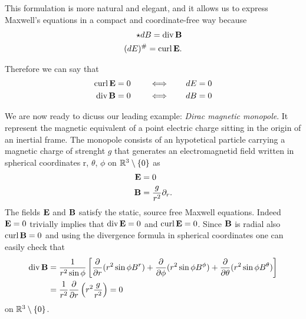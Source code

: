\documentclass{article}
\theoremstyle{definition}
\theoremstyle{remark}
\begin{document}
This formulation is more natural and elegant, and it allows us to express Maxwell's equations in a compact and coordinate-free way because
\begin{equation}\label{curldivform}
    \begin{aligned}
        \star dB = \operatorname{div} \mathbf{B} \\
        (dE)^\# = \operatorname{curl} \mathbf{E}.
    \end{aligned}
\end{equation}


Therefore we can say that
\begin{equation} \label{max}
    \begin{aligned}
        \operatorname{curl} \mathbf{E}=0 \qquad  & \iff & \quad dE=0 \\
        \operatorname{div} \mathbf{B}=0 \qquad & \iff & \quad dB=0
    \end{aligned}
\end{equation}


We are now ready to dicuss our leading example: \emph{Dirac magnetic monopole}. It represent the magnetic equivalent of a point electric charge sitting in the origin of an inertial frame. The monopole consists of an hypotetical particle carrying a magnetic charge of strenght \(g\) that generates an electromagnetid field written in spherical coordinates r, \(\theta\), \(\phi\) on \(\mathbb{R}^3\setminus\{0\}\) as 
\begin{equation}
    \begin{aligned}
     \mathbf{E} & = 0 \\
     \mathbf{B} & = \frac{g}{r^2}\partial_r.
\end{aligned}
\end{equation}
The fields \(\mathbf{E}\) and \(\mathbf{B}\) satisfy the static, source free Maxwell equations.
Indeed \(\mathbf{E}=0\) trivially implies that \(\operatorname{div}\mathbf{E}=0\) and \(\operatorname{curl}\mathbf{E}=0\). Since \(\mathbf{B}\) is radial also \(\operatorname{curl}\mathbf{B}=0\) and using the divergence formula in spherical coordinates one can easily check that 
\begin{align*}
    \operatorname{div} \mathbf{B} & = \frac{1}{r^2\sin\phi} \left[ \frac{\partial}{\partial r}(r^2\sin\phi B^r) + \frac{\partial}{\partial\phi} (r^2\sin\phi B^\phi) + \frac{\partial}{\partial\theta} (r^2\sin\phi B^\theta) \right] \\
    & = \frac{1}{r^2} \frac{\partial}{\partial r} \left(r^2\frac{g}{r^2}\right) =0
\end{align*}
on \(\mathbb{R}^3\setminus\{0\}\).
\end{document}
